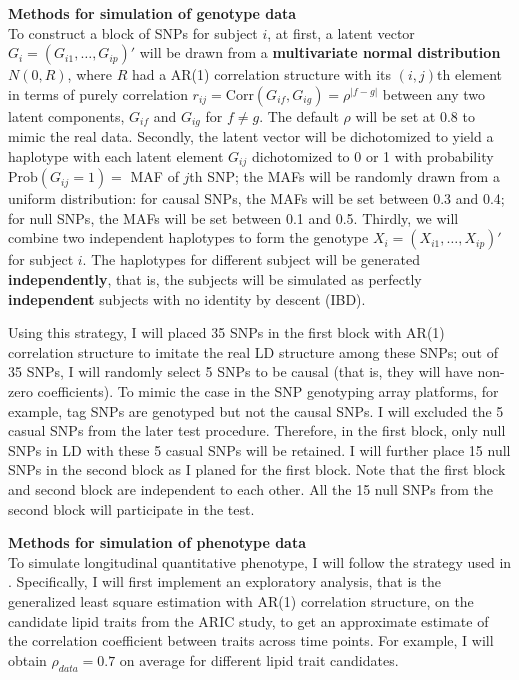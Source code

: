 \documentclass[12pt]{article}
\begin{document}
\textbf{Methods for simulation of genotype data}\\
To construct a block of SNPs for subject $i$, at first, a latent vector $G_i = (G_{i1}, \ldots, G_{ip})'$ will be drawn from a \textbf{multivariate normal distribution} $N(0,R)$, where $R$ had a AR(1) correlation structure with its $(i,j)$th element in terms of purely correlation $r_{ij} =\textrm{Corr} (G_{if}, G_{ig}) = \rho ^ { |f - g| }$ between any two latent components, $G_{if}$ and $G_{ig}$ for $f \neq g$. The default $\rho$ will be set at  $0.8$ to mimic the real data. Secondly, the latent vector will be dichotomized to yield a haplotype with each latent element $G_{ij}$ dichotomized to 0 or 1 with probability $\textrm{Prob} (G_{ij} = 1) = $ MAF of $j$th SNP; the MAFs will be randomly drawn from a uniform distribution: for causal SNPs, the MAFs will be set between 0.3 and 0.4; for null SNPs, the MAFs will be set between 0.1 and 0.5. Thirdly, we will combine two independent haplotypes to form the genotype $X_i = (X_{i1}, \ldots, X_{ip})' $ for subject $i$. The haplotypes for different subject will be generated \textbf{independently}, that is, the subjects will be simulated as perfectly \textbf{independent} subjects with no identity by descent (IBD). 

Using this strategy, I will placed 35 SNPs in the first block with AR(1) correlation structure to imitate the real LD structure among these SNPs; out of 35 SNPs, I will randomly select 5 SNPs to be causal (that is, they will have non-zero coefficients). To mimic the case in the SNP genotyping array platforms, for example, tag SNPs are genotyped but not the causal SNPs. I will excluded the 5 casual SNPs from the later test procedure. Therefore, in the first block, only null SNPs in LD with these 5 casual SNPs will be retained. I will further place 15 null SNPs in the second block as I planed for the first block. Note that the first block and second block are independent to each other. All the 15 null SNPs from the second block will participate in the test.

\textbf{Methods for simulation of phenotype data}\\
To simulate longitudinal quantitative phenotype, I will follow the strategy used in \cite{Song2013}. Specifically, I will first implement an exploratory analysis, that is the generalized least square estimation with AR(1) correlation structure, on the candidate lipid traits from the ARIC study, to get an approximate estimate of the correlation coefficient between traits across time points. For example, I will obtain $\rho_{data} = 0.7$ on average for different lipid trait candidates. 
\end{document}
